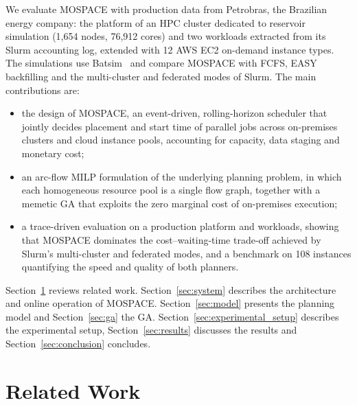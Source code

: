 \documentclass[conference]{IEEEtran}
\begin{document}
We evaluate MOSPACE with production data from Petrobras, the Brazilian energy company: the platform of an HPC cluster dedicated to reservoir simulation (1,654 nodes, 76,912 cores) and two workloads extracted from its Slurm accounting log, extended with 12 AWS EC2 on-demand instance types. The simulations use Batsim~\cite{batsim_jsspp16} and compare MOSPACE with FCFS, EASY backfilling and the multi-cluster and federated modes of Slurm. The main contributions are:
\begin{itemize}
  \item the design of MOSPACE, an event-driven, rolling-horizon scheduler that jointly decides placement and start time of parallel jobs across on-premises clusters and cloud instance pools, accounting for capacity, data staging and monetary cost;
  \item an arc-flow MILP formulation of the underlying planning problem, in which each homogeneous resource pool is a single flow graph, together with a memetic GA that exploits the zero marginal cost of on-premises execution;
  \item a trace-driven evaluation on a production platform and workloads, showing that MOSPACE dominates the cost--waiting-time trade-off achieved by Slurm's multi-cluster and federated modes, and a benchmark on 108 instances quantifying the speed and quality of both planners.
\end{itemize}

Section~\ref{sec:related_work} reviews related work. Section~\ref{sec:system} describes the architecture and online operation of MOSPACE. Section~\ref{sec:model} presents the planning model and Section~\ref{sec:ga} the GA. Section~\ref{sec:experimental_setup} describes the experimental setup, Section~\ref{sec:results} discusses the results and Section~\ref{sec:conclusion} concludes.

\section{Related Work}
\label{sec:related_work}
\end{document}
